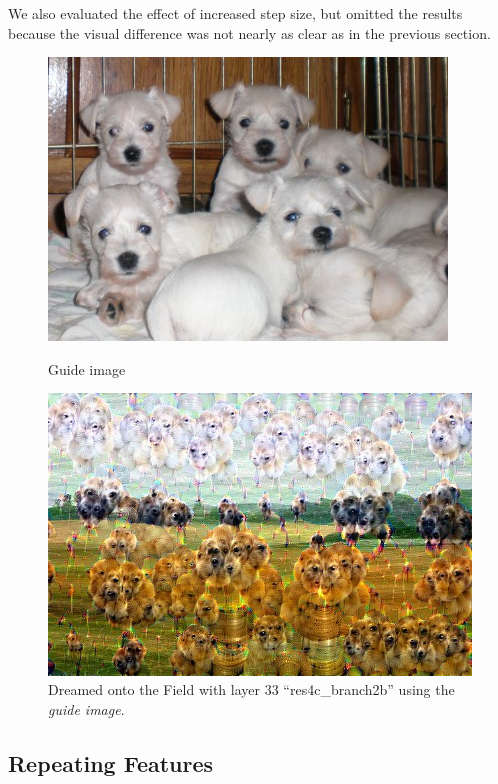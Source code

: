 We also evaluated the effect of increased step size, but omitted the results because the visual difference was not nearly as clear as in the previous section.

\begin{figure}[H]
	\centering
	\includegraphics[width=1\linewidth]{img/guide.jpg}
	\caption{Guide image\cite{imgpuppies}}
	\label{fig:guide}
	\endminipage\hfill
	\centering
	\includegraphics[width=1\linewidth]{img/guide_dream.jpg}
	\caption{Dreamed onto the Field with layer 33 \enquote{res4c\_branch2b} using the \textit{guide image}.}
	\label{fig:guide_dream}
	\endminipage\hfill
\end{figure}



\subsection{Repeating Features}
\label{sec:repeating-features}

